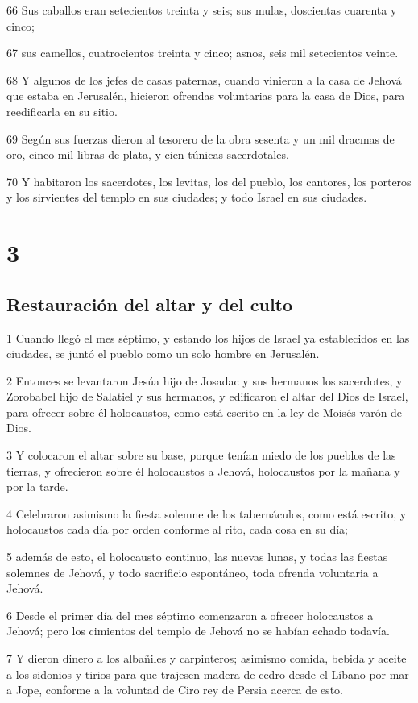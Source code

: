 \par 66 Sus caballos eran setecientos treinta y seis; sus mulas, doscientas cuarenta y cinco;
\par 67 sus camellos, cuatrocientos treinta y cinco; asnos, seis mil setecientos veinte.
\par 68 Y algunos de los jefes de casas paternas, cuando vinieron a la casa de Jehová que estaba en Jerusalén, hicieron ofrendas voluntarias para la casa de Dios, para reedificarla en su sitio.
\par 69 Según sus fuerzas dieron al tesorero de la obra sesenta y un mil dracmas de oro, cinco mil libras de plata, y cien túnicas sacerdotales.
\par 70 Y habitaron los sacerdotes, los levitas, los del pueblo, los cantores, los porteros y los sirvientes del templo en sus ciudades; y todo Israel en sus ciudades. 

\chapter{3}

\section*{Restauración del altar y del culto}

\par 1 Cuando llegó el mes séptimo, y estando los hijos de Israel ya establecidos en las ciudades, se juntó el pueblo como un solo hombre en Jerusalén.
\par 2 Entonces se levantaron Jesúa hijo de Josadac y sus hermanos los sacerdotes, y Zorobabel hijo de Salatiel y sus hermanos, y edificaron el altar del Dios de Israel, para ofrecer sobre él holocaustos, como está escrito en la ley de Moisés varón de Dios.
\par 3 Y colocaron el altar sobre su base, porque tenían miedo de los pueblos de las tierras, y ofrecieron sobre él holocaustos a Jehová, holocaustos por la mañana y por la tarde. 
\par 4 Celebraron asimismo la fiesta solemne de los tabernáculos, como está escrito, y holocaustos cada día por orden conforme al rito, cada cosa en su día;
\par 5 además de esto, el holocausto continuo, las nuevas lunas, y todas las fiestas solemnes de Jehová, y todo sacrificio espontáneo, toda ofrenda voluntaria a Jehová.
\par 6 Desde el primer día del mes séptimo comenzaron a ofrecer holocaustos a Jehová; pero los cimientos del templo de Jehová no se habían echado todavía.
\par 7 Y dieron dinero a los albañiles y carpinteros; asimismo comida, bebida y aceite a los sidonios y tirios para que trajesen madera de cedro desde el Líbano por mar a Jope, conforme a la voluntad de Ciro rey de Persia acerca de esto.

